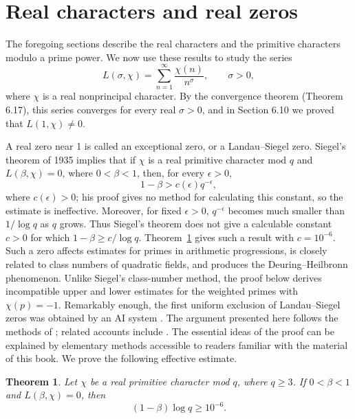 \documentclass[11pt,twoside,leqno]{article}
\theoremstyle{apostol}
\newtheorem{theorem}{Theorem}
\begin{document}
\setcounter{page}{224}

\section{Real characters and real zeros}
\label{sec:start}

The foregoing sections describe the real characters and the primitive
characters modulo a prime power. We now use these results to study the series
\[
 L(\sigma,\chi)=\sum_{n=1}^{\infty}\frac{\chi(n)}{n^\sigma},
 \qquad \sigma>0,
\]
where \(\chi\) is a real nonprincipal character. By the convergence theorem
(Theorem 6.17), this series converges for every real \(\sigma>0\), and in
Section 6.10 we proved that \(L(1,\chi)\ne0\).

A real zero near 1 is called an exceptional zero, or a Landau--Siegel zero.
Siegel's theorem of 1935 implies that if \(\chi\) is a real primitive character
mod \(q\) and \(L(\beta,\chi)=0\), where \(0<\beta<1\), then, for every
\(\epsilon>0\),
\[
 1-\beta>c(\epsilon)q^{-\epsilon},
\]
where \(c(\epsilon)>0\); his proof gives no method for calculating this
constant, so the estimate is ineffective. Moreover, for fixed \(\epsilon>0\),
\(q^{-\epsilon}\) becomes much smaller than \(1/\log q\) as \(q\) grows.
Thus Siegel's theorem does not give a calculable constant \(c>0\) for which
\(1-\beta\ge c/\log q\). Theorem~\ref{thm:main} gives such a result with
\(c=10^{-6}\). Such a zero affects estimates for primes in arithmetic
progressions, is closely related to class numbers of quadratic fields, and
produces the Deuring--Heilbronn phenomenon. Unlike Siegel's class-number method,
the proof below derives
incompatible upper and lower estimates for the weighted primes with
\(\chi(p)=-1\). Remarkably enough, the first uniform exclusion of
Landau--Siegel zeros was obtained by an AI system \cite{openai}. The argument
presented here follows
the methods of \cite{openai,green,stepanovnote}; related accounts include
\cite{barreto,banks,kerr,tao,vandijk}. The essential ideas of the proof can be
explained by elementary methods accessible to readers familiar with the
material of this book. We prove the following effective estimate.

\begin{theorem}\label{thm:main}
Let \(\chi\) be a real primitive character mod \(q\), where \(q\ge3\).
If \(0<\beta<1\) and \(L(\beta,\chi)=0\), then
\begin{equation}\label{eq:main}
 (1-\beta)\log q\ge10^{-6}.
\end{equation}
\end{theorem}
\end{document}
